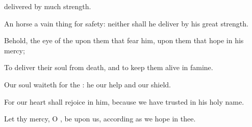 {delivered by
much
strength.
\par }{\Q {}An
horse
{} a vain
thing for
safety: neither shall he
deliver
{} by his
great
strength.
\par }{\Q {}Behold, the
eye of the
{}
{} upon them that
fear him, upon them that
hope in his
mercy;
\par }{\Q {}To
deliver their
soul from
death, and to keep them
alive in
famine.
\par }{\Q {}Our
soul
waiteth for the
{}: he
{} our
help and our
shield.
\par }{\Q {}For our
heart shall
rejoice in him, because we have
trusted in his
holy
name.
\par }{\Q {}Let thy
mercy, O
{}, be upon us, according as we
hope in thee.

}
